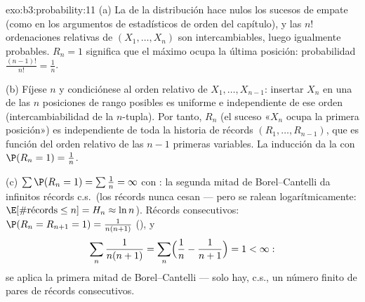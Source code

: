 \begin{solution}{exo:b3:probability:11}
(a) La  de la
distribución hace nulos los sucesos de empate (como en los argumentos de
estadísticos de orden del capítulo), y las $n!$ ordenaciones relativas
de $(X_1, \dots, X_n)$ son intercambiables, luego igualmente probables.
$R_n = 1$ significa que el máximo ocupa la última posición: probabilidad
$\frac{(n-1)!}{n!} = \frac1n$.

(b) Fíjese $n$ y condiciónese al orden relativo de $X_1,
\dots, X_{n-1}$: insertar $X_n$ en una de las $n$ posiciones de rango
posibles es uniforme e
independiente de ese orden
(intercambiabilidad de la $n$-tupla). Por tanto, $R_n$ (el suceso «$X_n$
ocupa la primera posición») es
independiente de toda la
historia de récords $(R_1, \dots, R_{n-1})$, que es función del orden
relativo de las $n - 1$ primeras variables. La inducción da la
  con
$\P(R_n = 1) =
\frac1n$.

(c) $\sum\P(R_n = 1) = \sum\frac1n = \infty$ con
: la segunda
mitad de Borel--Cantelli da infinitos récords c.s.\ (los récords nunca
cesan --- pero se ralean logarítmicamente:
$\E[\#\text{récords} \leq n] =
H_n \approx \ln n$). Récords consecutivos: $\P(R_n = R_{n+1}
= 1) = \frac1{n(n+1)}$
(), y
\[
\sum_n\frac1{n(n+1)} = \sum_n\Bigl(\frac1n -
\frac1{n+1}\Bigr) = 1 < \infty :
\]
se aplica la primera mitad de Borel--Cantelli --- solo hay, c.s., un
número finito de pares de récords consecutivos.
\end{solution}

